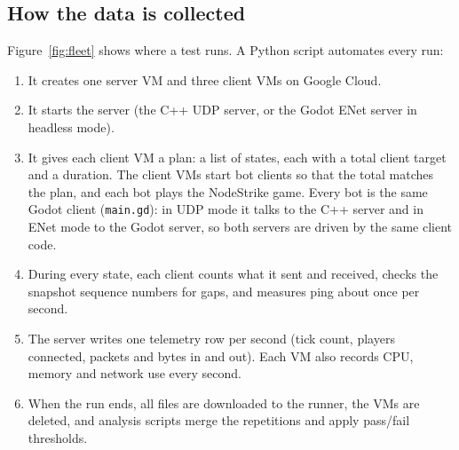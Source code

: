 \documentclass[11pt]{article}
\begin{document}
\subsection{How the data is collected}
Figure~\ref{fig:fleet} shows where a test runs. A Python script automates every run:

\begin{enumerate}
\item It creates one server VM and three client VMs on Google Cloud.
\item It starts the server (the C++ UDP server, or the Godot ENet server in headless mode).
\item It gives each client VM a plan: a list of states, each with a
total client target and a duration. The client VMs start bot clients so that the
total matches the plan, and each bot plays the NodeStrike game. Every bot is the same Godot client (\texttt{main.gd}): in UDP mode it talks to the C++ server and in ENet mode to the Godot server, so both servers are driven by the same client code.
\item During every state, each client counts what it sent and received, checks
the snapshot sequence numbers for gaps, and measures ping about once per second.
\item The server writes one telemetry row per second (tick count, players
connected, packets and bytes in and out). Each VM also records CPU, memory and
network use every second.
\item When the run ends, all files are downloaded to the runner, the VMs are
deleted, and analysis scripts merge the repetitions and apply pass/fail
thresholds.
\end{enumerate}
\end{document}
